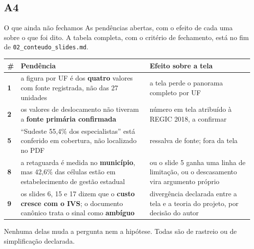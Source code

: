 \documentclass[aspectratio=169,10pt]{beamer}
\begin{document}
\subsection{A4}

\begin{frame}{O que ainda não fechamos}
  \vspace{0.1em}
  {\small As pendências abertas, com o efeito de cada uma sobre o que foi
  dito. A tabela completa, com o critério de fechamento, está no fim de
  \texttt{02\_conteudo\_slides.md}.}

  \vspace{0.3em}
  {\scriptsize\renewcommand{\arraystretch}{1.2}
  \begin{tabularx}{\textwidth}{@{}>{\centering\arraybackslash}p{} L >{\raggedright\arraybackslash}p{0.36\textwidth}@{}}
    \toprule
    \bfseries \# & \bfseries Pendência & \bfseries Efeito sobre a tela \\
    \midrule
    \textbf{1} & a figura por UF é dos \textbf{quatro} valores com fonte
      registrada, não das 27 unidades & a tela perde o panorama completo por
      UF \\
    \textbf{2} & os valores de deslocamento não tiveram a \textbf{fonte
      primária confirmada} & número em tela atribuído à REGIC 2018, a
      confirmar \\
    \textbf{5} & ``Sudeste 55,4\% dos especialistas'' está conferido em
      cobertura, não localizado no PDF & ressalva de fonte; fora da tela \\
    \textbf{8} & a retaguarda é medida no \textbf{município}, mas 42,6\% das
      células estão em estabelecimento de gestão estadual & ou o slide 5 ganha
      uma linha de limitação, ou o descasamento vira argumento próprio \\
    \textbf{9} & os slides 6, 15 e 17 dizem que o \textbf{custo cresce com o
      IVS}; o documento canônico trata o sinal como \textbf{ambíguo} &
      divergência declarada entre a tela e a teoria do projeto, por decisão do
      autor \\
    \bottomrule
  \end{tabularx}}

  \vspace{0.25em}
  \begin{destaque}[0.96\textwidth]
    \scriptsize Nenhuma delas muda a pergunta nem a hipótese. Todas são de
    rastreio ou de simplificação declarada.
  \end{destaque}

\end{frame}
\end{document}
